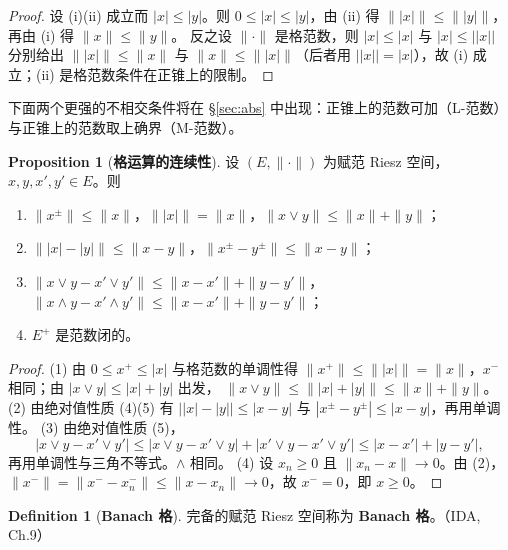 \documentclass[oneside]{book}
\theoremstyle{definition}
\theoremstyle{definition}
\newtheorem{proposition}{Proposition}[section]
\newtheorem{definition}{Definition}[section]
\begin{document}
	\begin{proof}
		设 (i)(ii) 成立而 $|x|\leqslant|y|$。则 $0\leqslant|x|\leqslant|y|$，由 (ii) 得 $\big\||x|\big\|\leqslant\big\||y|\big\|$，再由 (i) 得 $\|x\|\leqslant\|y\|$。
		反之设 $\|\cdot\|$ 是格范数，则 $|x|\leqslant|x|$ 与 $|x|\leqslant\big||x|\big|$ 分别给出 $\big\||x|\big\|\leqslant\|x\|$ 与 $\|x\|\leqslant\big\||x|\big\|$（后者用 $\big||x|\big|=|x|$），故 (i) 成立；(ii) 是格范数条件在正锥上的限制。
	\end{proof}
	
	下面两个更强的不相交条件将在 \S\ref{sec:abs} 中出现：正锥上的范数可加（L-范数）与正锥上的范数取上确界（M-范数）。
	
	\begin{proposition}[\bfseries{格运算的连续性}]
		设 $(E,\|\cdot\|)$ 为赋范 Riesz 空间，$x,y,x',y'\in E$。则
		\begin{enumerate}[label=(\arabic*),leftmargin=2.2em,itemsep=0.1em,topsep=0.3em]
			\item $\|x^{\pm}\|\leqslant\|x\|$，$\big\||x|\big\|=\|x\|$，$\|x\vee y\|\leqslant\|x\|+\|y\|$；
			\item $\big\||x|-|y|\big\|\leqslant\|x-y\|$，$\|x^{\pm}-y^{\pm}\|\leqslant\|x-y\|$；
			\item $\|x\vee y-x'\vee y'\|\leqslant\|x-x'\|+\|y-y'\|$，$\|x\wedge y-x'\wedge y'\|\leqslant\|x-x'\|+\|y-y'\|$；
			\item $E^{+}$ 是范数闭的。
		\end{enumerate}
	\end{proposition}
	
	\begin{proof}
		(1) 由 $0\leqslant x^{+}\leqslant|x|$ 与格范数的单调性得 $\|x^{+}\|\leqslant\big\||x|\big\|=\|x\|$，$x^{-}$ 相同；由 $|x\vee y|\leqslant|x|+|y|$ 出发，
		$\|x\vee y\|\leqslant\big\||x|+|y|\big\|\leqslant\|x\|+\|y\|$。
		(2) 由绝对值性质 (4)(5) 有 $\big||x|-|y|\big|\leqslant|x-y|$ 与 $|x^{\pm}-y^{\pm}|\leqslant|x-y|$，再用单调性。
		(3) 由绝对值性质 (5)，
		\[
		|x\vee y-x'\vee y'|\leqslant|x\vee y-x'\vee y|+|x'\vee y-x'\vee y'|\leqslant|x-x'|+|y-y'|,
		\]
		再用单调性与三角不等式。$\wedge$ 相同。
		(4) 设 $x_{n}\geqslant0$ 且 $\|x_{n}-x\|\to0$。由 (2)，$\|x^{-}\|=\|x^{-}-x_{n}^{-}\|\leqslant\|x-x_{n}\|\to0$，故 $x^{-}=0$，即 $x\geqslant0$。
	\end{proof}
	
	\begin{definition}[\bfseries{Banach 格}]
		完备的赋范 Riesz 空间称为 \textbf{Banach 格}。（IDA, Ch.9）
	\end{definition}
	
\end{document}
